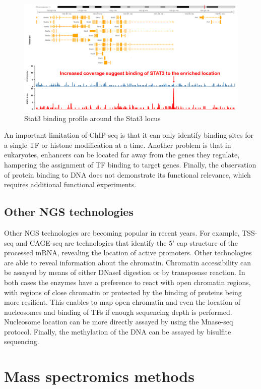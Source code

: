 \documentclass[]{book}
\theoremstyle{definition}
\theoremstyle{definition}
\theoremstyle{definition}
\theoremstyle{remark}
\begin{document}
\begin{figure}
\includegraphics[width=23.21in]{pic/stat3_chipseq} \caption{Stat3 binding profile around the Stat3 locus}\label{fig:stat3-chipseq}
\end{figure}

An important limitation of ChIP-seq is that it can only identify binding
sites for a single TF or histone modification at a time. Another problem
is that in eukaryotes, enhancers can be located far away from the genes
they regulate, hampering the assignment of TF binding to target genes.
Finally, the observation of protein binding to DNA does not demonstrate
its functional relevance, which requires additional functional
experiments.

\subsection{Other NGS technologies}\label{other-ngs-technologies}

Other NGS technologies are becoming popular in recent years. For
example, TSS-seq and CAGE-seq are technologies that identify the 5' cap
structure of the processed mRNA, revealing the location of active
promoters. Other technologies are able to reveal information about the
chromatin. Chromatin accessibility can be assayed by means of either
DNaseI digestion or by transposase reaction. In both cases the enzymes
have a preference to react with open chromatin regions, with regions of
close chromatin or protected by the binding of proteins being more
resilient. This enables to map open chromatin and even the location of
nucleosomes and binding of TFs if enough sequencing depth is performed.
Nucleosome location can be more directly assayed by using the Mnase-seq
protocol. Finally, the methylation of the DNA can be assayed by
bisulfite sequencing.

\section{Mass spectromics methods}\label{mass-spectromics-methods}
\end{document}
